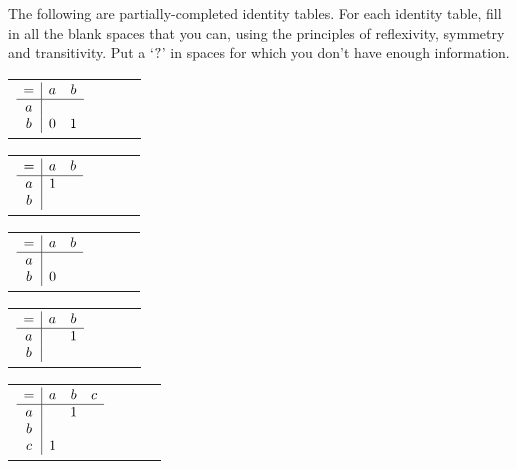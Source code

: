 \documentclass[PHIL101-Textbook.tex]{subfiles}
\begin{document}
\pagebreak
\practiceproblems
\problempart
\label{pr.identity-tables}
The following are partially-completed identity tables. For each identity table, fill in all the blank spaces that you can, using the principles of reflexivity, symmetry and transitivity. Put a `$?$' in spaces for which you don't have enough information. 

\begin{earg}
\item\begin{tabular}{cccc}
	$\begin{array}{c|cc}
	   = & a & b\\ \hline
	   a &   &\\
	   b &0& 1
	 \end{array}$
	 \end{tabular}\medskip\medskip
\item\begin{tabular}{cccc}
	$\begin{array}{c|cc}
	   = & a & b\\ \hline
	   a &1&\\
	   b &   &
	 \end{array}$
	 \end{tabular}\medskip\medskip
\item\begin{tabular}{cccc}
	$\begin{array}{c|cc}
	   = & a & b\\ \hline
	   a &   &\\
	   b &0&
	 \end{array}$
	 \end{tabular}\medskip\medskip
\item\begin{tabular}{cccc}
	$\begin{array}{c|cc}
	  = & a & b\\ \hline
	  a &   &1\\
	  b &   &
	 \end{array}$
	 \end{tabular}\medskip\medskip
\item\begin{tabular}{cccc}
	$\begin{array}{c|ccc}
	   = & a & b & c\\ \hline
	   a &&1&\\
	   b &&&\\
	   c &1&&
	 \end{array}$
	 \end{tabular}\medskip\medskip

\end{earg}
\end{document}
